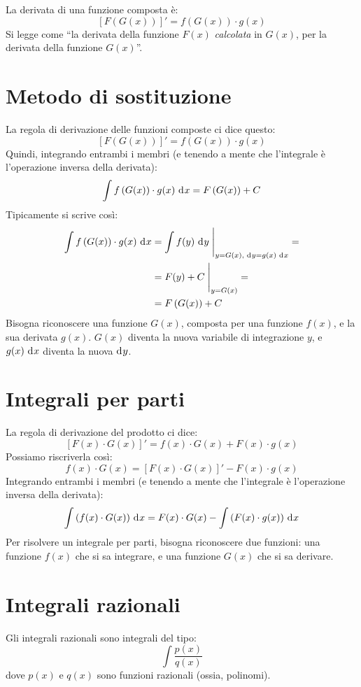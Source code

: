 La derivata di una funzione composta \`e:
\[
\left[ F \left(G(x) \right) \right]' =
f \left( G(x) \right) \cdot g(x)
\]
Si legge come ``la derivata della funzione $F(x)$ \emph{calcolata} 
in $G(x)$, per la derivata della funzione $G(x)$''.

\section{Metodo di sostituzione}
La regola di derivazione delle funzioni composte ci dice questo:
\[
\left[ F \left(G(x) \right) \right]' =
f \left( G(x) \right) \cdot g(x)
\]
Quindi, integrando entrambi i membri (e tenendo a mente che l'integrale
\`e l'operazione inversa della derivata):
\[
\int f \left( G(x) \right) \cdot g(x) \dx =
F \left(G(x) \right) + C
\]
Tipicamente si scrive cos\`i:
\begin{align*}
\int f \left( G(x) \right) \cdot g(x) \dx &=
\int \substitute{f (y) \dx[y]}{y = G(x) ,\, \dx[y] = g(x) \dx} = \\
&= \substitute{F(y) + C}{y = G(x)} = \\
&= F \left( G(x) \right) + C
\end{align*}
Bisogna riconoscere una funzione $G(x)$, composta per una funzione $f(x)$,
e la sua derivata $g(x)$. $G(x)$ diventa la nuova variabile di integrazione
$y$, e $g(x) \dx$ diventa la nuova $\diff y$.

\section{Integrali per parti}

La regola di derivazione del prodotto ci dice:
\[
\left[ F(x) \cdot G(x) \right]' = 
f(x) \cdot G(x) + F(x) \cdot g(x)
\]
Possiamo riscriverla cos\`i:
\[
f(x) \cdot G(x) = 
\left[ F(x) \cdot G(x) \right]' - F(x) \cdot g(x)
\]
Integrando entrambi i membri (e tenendo a mente che l'integrale \`e
l'operazione inversa della derivata):
\[
\int \left( f(x) \cdot G(x) \right) \dx = F(x) \cdot G(x) - \int \left( F(x) \cdot g(x) \right) \dx
\]
Per risolvere un integrale per parti, bisogna riconoscere due funzioni:
una funzione $f(x)$ che si sa integrare, e una funzione $G(x)$ che si sa
derivare.

\section{Integrali razionali}

Gli integrali razionali sono integrali del tipo:
\[
\int \frac{p(x)}{q(x)}
\]
dove $p(x)$ e $q(x)$ sono funzioni razionali (ossia, polinomi).

